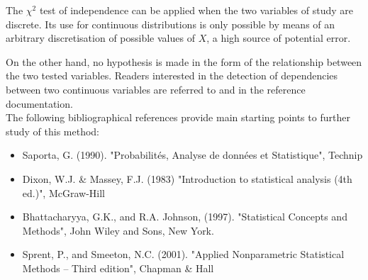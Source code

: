 {
  The $\chi^2$ test of independence can be applied when the two variables of study are discrete. Its use for continuous distributions is only possible by means of an arbitrary discretisation of possible values of $X$, a high source of potential error.

  On the other hand, no hypothesis is made in the form of the relationship between the two tested variables.
  Readers interested in the detection of dependencies between two continuous variables are referred to  and  in the reference documentation.\\

  The following bibliographical references provide main starting points to further study of this method:
  \begin{itemize}
  \item Saporta, G. (1990). "Probabilités, Analyse de données et Statistique", Technip
  \item Dixon, W.J. \& Massey, F.J. (1983) "Introduction to statistical analysis (4th ed.)", McGraw-Hill
  \item Bhattacharyya, G.K., and R.A. Johnson, (1997). "Statistical Concepts and Methods", John Wiley and Sons, New York.
  \item Sprent, P., and Smeeton, N.C. (2001). "Applied Nonparametric Statistical Methods -- Third edition", Chapman \& Hall
\end{itemize}}
